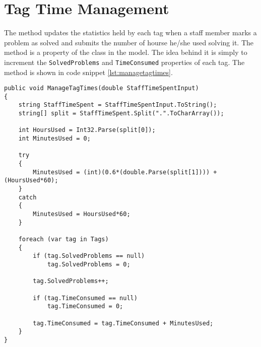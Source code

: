 \section{Tag Time Management}
\label{sec:managetagtimes}

The  method updates the statistics held by each tag when a staff member marks a problem as solved and submits the number of hourse he/she used solving it. The  method is a property of the  class in the model.
The idea behind it is simply to increment the \verb+SolvedProblems+ and \verb+TimeConsumed+ properties of each tag. The method is shown in code snippet \ref{lst:managetagtimes}.

\begin{lstlisting}[style=sourceCode, caption=\myCaption{The ManageTagTimes method}, label=lst:managetagtimes]
public void ManageTagTimes(double StaffTimeSpentInput)
{
    string StaffTimeSpent = StaffTimeSpentInput.ToString();
    string[] split = StaffTimeSpent.Split(".".ToCharArray());
    
    int HoursUsed = Int32.Parse(split[0]);
    int MinutesUsed = 0;

    try
    {
        MinutesUsed = (int)(0.6*(double.Parse(split[1]))) + (HoursUsed*60);
    }
    catch
    {
        MinutesUsed = HoursUsed*60;
    }

    foreach (var tag in Tags)
    {
        if (tag.SolvedProblems == null)
            tag.SolvedProblems = 0;
        
        tag.SolvedProblems++;

        if (tag.TimeConsumed == null)
            tag.TimeConsumed = 0;

        tag.TimeConsumed = tag.TimeConsumed + MinutesUsed;
    }
}
\end{lstlisting}